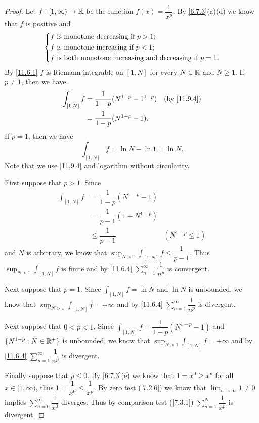 \begin{proof}
  Let \(f : [1, \infty) \to \mathbb{R}\) be the function \(f(x) = \dfrac{1}{x^p}\).
  By \cref{6.7.3}(a)(d) we know that \(f\) is positive and
  \[
    \begin{dcases}
      f \text{ is monotone decreasing if } p > 1; \\
      f \text{ is monotone increasing if } p < 1; \\
      f \text{ is both monotone increasing and decreasing if } p = 1.
    \end{dcases}
  \]
  By \cref{11.6.1} \(f\) is Riemann integrable on \([1, N]\) for every \(N \in \mathbb{R}\) and \(N \geq 1\).
  If \(p \neq 1\), then we have
  \begin{align*}
    \int_{[1, N]} f & = \dfrac{1}{1 - p} (N^{1 - p} - 1^{1 - p}) &  & \by{11.9.4} \\
                    & = \dfrac{1}{1 - p} (N^{1 - p} - 1).
  \end{align*}
  If \(p = 1\), then we have
  \[
    \int_{[1, N]} f = \ln N - \ln 1 = \ln N.
  \]
  Note that we use \cref{11.9.4} and logarithm without circularity.

  First suppose that \(p > 1\).
  Since
  \begin{align*}
    \int_{[1, N]} f & = \dfrac{1}{1 - p} (N^{1 - p} - 1)                      \\
                    & = \dfrac{1}{p - 1} (1 - N^{1 - p})                      \\
                    & \leq \dfrac{1}{p - 1}              & (N^{1 - p} \leq 1)
  \end{align*}
  and \(N\) is arbitrary, we know that \(\sup_{N > 1} \int_{[1, N]} f \leq \dfrac{1}{p - 1}\).
  Thus \(\sup_{N > 1} \int_{[1, N]} f\) is finite and by \cref{11.6.4} \(\sum_{n = 1}^\infty \dfrac{1}{n^p}\) is convergent.

  Next suppose that \(p = 1\).
  Since \(\int_{[1, N]} f = \ln N\) and \(\ln N\) is unbounded, we know that \(\sup_{N > 1} \int_{[1, N]} f = +\infty\) and by \cref{11.6.4} \(\sum_{n = 1}^\infty \dfrac{1}{n^p}\) is divergent.

  Next suppose that \(0 < p < 1\).
  Since \(\int_{[1, N]} f = \dfrac{1}{1 - p} (N^{1 - p} - 1)\) and \(\{N^{1 - p} : N \in \mathbb{R}^+\}\) is unbounded, we know that \(\sup_{N > 1} \int_{[1, N]} f = +\infty\) and by \cref{11.6.4} \(\sum_{n = 1}^\infty \dfrac{1}{n^p}\) is divergent.

  Finally suppose that \(p \leq 0\).
  By \cref{6.7.3}(e) we know that \(1 = x^0 \geq x^p\) for all \(x \in [1, \infty)\), thus \(1 = \dfrac{1}{x^0} \leq \dfrac{1}{x^p}\).
  By zero test (\cref{7.2.6}) we know that \(\lim_{n \to \infty} 1 \neq 0\) implies \(\sum_{n = 0}^\infty \dfrac{1}{x^0}\) diverges.
  Thus by comparison test (\cref{7.3.1}) \(\sum_{n = 1}^N \dfrac{1}{x^p}\) is divergent.
\end{proof}

